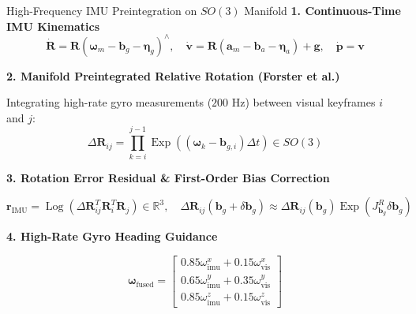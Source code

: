 \documentclass[aspectratio=169, 10pt]{beamer}
\begin{document}
\begin{frame}{High-Frequency IMU Preintegration on $SO(3)$ Manifold}
  {\normalsize \textbf{\textcolor{NavyBlue}{1. Continuous-Time IMU Kinematics}}}
  \vspace{0.1cm}
  \begin{equation}
    \dot{\mathbf{R}} = \mathbf{R} (\boldsymbol{\omega}_m - \mathbf{b}_g - \boldsymbol{\eta}_g)^\wedge, \quad
    \dot{\mathbf{v}} = \mathbf{R} (\mathbf{a}_m - \mathbf{b}_a - \boldsymbol{\eta}_a) + \mathbf{g}, \quad
    \dot{\mathbf{p}} = \mathbf{v}
  \end{equation}

  \vspace{0.15cm}
  {\normalsize \textbf{\textcolor{NavyBlue}{2. Manifold Preintegrated Relative Rotation (Forster et al.)}}}
  \vspace{0.1cm}

  Integrating high-rate gyro measurements ($200\text{ Hz}$) between visual keyframes $i$ and $j$:
  \begin{equation}
    \Delta \mathbf{R}_{ij} = \prod_{k=i}^{j-1} \operatorname{Exp}\left( (\boldsymbol{\omega}_k - \mathbf{b}_{g,i}) \Delta t \right) \in SO(3)
  \end{equation}

  \vspace{0.15cm}
  {\normalsize \textbf{\textcolor{NavyBlue}{3. Rotation Error Residual \& First-Order Bias Correction}}}
  \vspace{0.1cm}

  \begin{equation}
    \mathbf{r}_{\text{IMU}} = \operatorname{Log}\left( \Delta \mathbf{R}_{ij}^T \mathbf{R}_i^T \mathbf{R}_j \right) \in \mathbb{R}^3, \quad
    \Delta \mathbf{R}_{ij}(\mathbf{b}_g + \delta \mathbf{b}_g) \approx \Delta \mathbf{R}_{ij}(\mathbf{b}_g) \operatorname{Exp}\left( J_{\mathbf{b}_g}^R \delta \mathbf{b}_g \right)
  \end{equation}

  \vspace{0.15cm}
  {\normalsize \textbf{\textcolor{NavyBlue}{4. High-Rate Gyro Heading Guidance}}}
  \vspace{0.1cm}

  \begin{equation}
    \boldsymbol{\omega}_{\text{fused}} = \begin{bmatrix} 
      0.85 \omega_{\text{imu}}^x + 0.15 \omega_{\text{vis}}^x \\[2pt] 
      0.65 \omega_{\text{imu}}^y + 0.35 \omega_{\text{vis}}^y \\[2pt] 
      0.85 \omega_{\text{imu}}^z + 0.15 \omega_{\text{vis}}^z 
    \end{bmatrix}
  \end{equation}
\end{frame}
\end{document}
